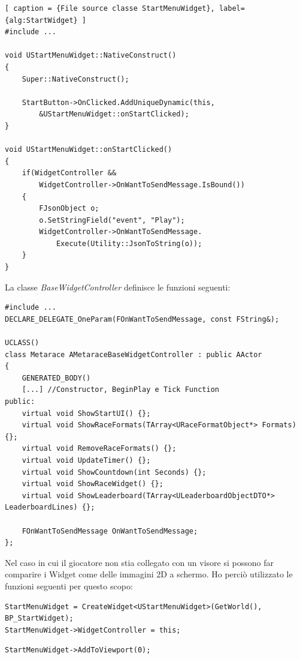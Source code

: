     
    \begin{lstlisting}[ caption = {File source classe StartMenuWidget}, label= {alg:StartWidget} ]
#include ...

void UStartMenuWidget::NativeConstruct()
{
    Super::NativeConstruct();

    StartButton->OnClicked.AddUniqueDynamic(this, 
        &UStartMenuWidget::onStartClicked);
}

void UStartMenuWidget::onStartClicked()
{
    if(WidgetController && 
        WidgetController->OnWantToSendMessage.IsBound())
    {
        FJsonObject o;
        o.SetStringField("event", "Play");
        WidgetController->OnWantToSendMessage.
            Execute(Utility::JsonToString(o));	
    }
}
    \end{lstlisting}

    La classe \textit{BaseWidgetController} definisce le funzioni seguenti:

    \begin{lstlisting}[caption=File header della classe astratta BaseWidgetController]
#include ...
DECLARE_DELEGATE_OneParam(FOnWantToSendMessage, const FString&);

UCLASS()
class Metarace AMetaraceBaseWidgetController : public AActor
{
    GENERATED_BODY()
    [...] //Constructor, BeginPlay e Tick Function
public:
    virtual void ShowStartUI() {};
    virtual void ShowRaceFormats(TArray<URaceFormatObject*> Formats) {};
    virtual void RemoveRaceFormats() {};
    virtual void UpdateTimer() {};
    virtual void ShowCountdown(int Seconds) {};
    virtual void ShowRaceWidget() {};
    virtual void ShowLeaderboard(TArray<ULeaderboardObjectDTO*> LeaderboardLines) {};

    FOnWantToSendMessage OnWantToSendMessage;
};
    \end{lstlisting}

    Nel caso in cui il giocatore non stia collegato con un visore si possono far comparire i Widget come delle immagini 2D a schermo.
    Ho perciò utilizzato le funzioni seguenti per questo scopo:

    \begin{lstlisting}[caption = Crezione di istanza di Widget con StartMenuWidget come esempio]
StartMenuWidget = CreateWidget<UStartMenuWidget>(GetWorld(), BP_StartWidget);
StartMenuWidget->WidgetController = this;
    \end{lstlisting}

    \begin{lstlisting}[firstnumber=4, caption = Aggiunta di Widget al Viewport]
StartMenuWidget->AddToViewport(0);
    \end{lstlisting}

